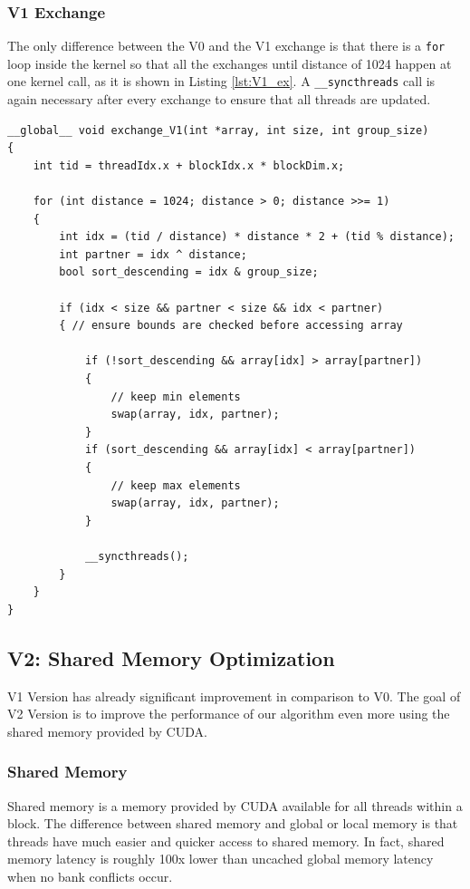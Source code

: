 \documentclass[a4paper,12pt]{article}
\begin{document}
\subsubsection*{V1 Exchange}
The only difference between the V0 and the V1 exchange is that there is a \texttt{for} loop inside the kernel so that all the exchanges until distance of 1024 happen at one kernel call, as it is shown in Listing \ref{lst:V1_ex}. A \texttt{\_\_syncthreads} call is again necessary after every exchange to ensure that all threads are updated.
\\
\begin{lstlisting}[caption={V1 Exchange algorithm}, label={lst:V1_ex}]  
__global__ void exchange_V1(int *array, int size, int group_size)
{
    int tid = threadIdx.x + blockIdx.x * blockDim.x;

    for (int distance = 1024; distance > 0; distance >>= 1)
    {
        int idx = (tid / distance) * distance * 2 + (tid % distance);
        int partner = idx ^ distance;
        bool sort_descending = idx & group_size;

        if (idx < size && partner < size && idx < partner)
        { // ensure bounds are checked before accessing array

            if (!sort_descending && array[idx] > array[partner])
            {
                // keep min elements
                swap(array, idx, partner);
            }
            if (sort_descending && array[idx] < array[partner])
            {
                // keep max elements
                swap(array, idx, partner);
            }

            __syncthreads();
        }
    }
}
\end{lstlisting}

\subsection{V2: Shared Memory Optimization}
V1 Version has already significant improvement in comparison to V0. The goal of V2 Version is to improve the performance of our algorithm even more using the shared memory provided by CUDA.

\subsubsection*{Shared Memory}
Shared memory is a memory provided by CUDA available for all threads within a block. The difference between shared memory and global or local memory is that threads have much easier and quicker access to shared memory. In fact, shared memory latency is roughly 100x lower than uncached global memory latency when no bank conflicts occur. 
\end{document}
